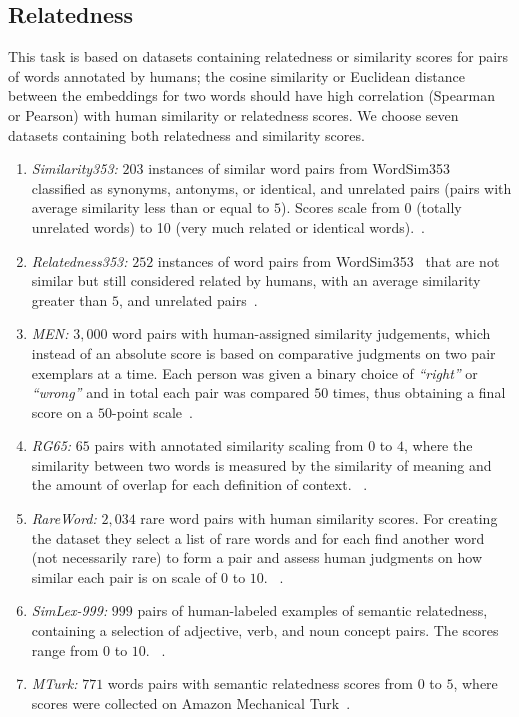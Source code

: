  \subsection{Relatedness}
This task is based on datasets containing relatedness or similarity scores for pairs of words annotated by humans; the cosine similarity or Euclidean distance between the embeddings for two words should have high correlation (Spearman or Pearson) with human similarity or relatedness scores. We choose seven datasets containing both relatedness and similarity scores. 
\begin{enumerate}
 \item \emph{Similarity353:} $203$ instances of similar word pairs from WordSim353~ classified as synonyms, antonyms, or identical, and unrelated pairs (pairs with average similarity less than or equal to $5$). Scores scale from 0 (totally unrelated words) to 10 (very much related or identical words).~.
 \item \emph{Relatedness353:} $252$ instances of word pairs from WordSim353~ that are not similar but still considered related by humans, with an average similarity greater than $5$, and unrelated pairs~.
 \item \emph{MEN:} $3,000$ word pairs with human-assigned similarity judgements, which instead of an absolute score is based on comparative judgments on two pair exemplars at a time. Each person was given a binary choice of \emph{``right''} or \emph{``wrong''} and in total each pair was compared $50$ times, thus obtaining a final score on a $50$-point scale~.
 \item \emph{RG65:} $65$ pairs with annotated similarity scaling from $0$ to $4$, where the similarity between two words is measured by the similarity of meaning and the
amount of overlap for each definition of context. ~.
 \item \emph{RareWord:} $2,034$ rare word pairs with human similarity scores. For creating the dataset they select a list of rare words and for each find another word (not necessarily rare) to form a pair and assess human judgments on how similar each pair is on scale of $0$ to $10$. ~.
 \item \emph{SimLex-999:} $999$ pairs of human-labeled examples of semantic relatedness, containing a selection of adjective, verb, and noun concept pairs. The scores range from $0$ to $10$. ~.
 \item \emph{MTurk:} $771$ words pairs with semantic relatedness scores from
$0$ to $5$, where scores were collected on Amazon Mechanical Turk~.
\end{enumerate}

